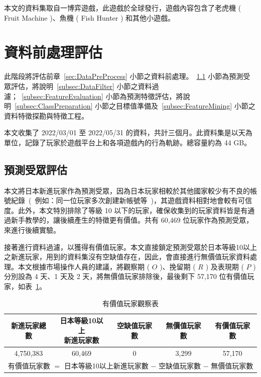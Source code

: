 本文的資料集取自一博弈遊戲，此遊戲於全球發行，遊戲內容包含了老虎機 ( Fruit Machine )、魚機 ( Fish Hunter ) 和其他小遊戲。
\newpage

\section{資料前處理評估}
\label{sec:DataPreprocessEvaluation}

此階段將評估前章~\ref{sec:DataPreProcess} 小節之資料前處理。~\ref{subsec:AudienceEvaluation} 小節為預測受眾評估，將說明~\ref{subsec:DataFilter} 小節之資料過濾；~\ref{subsec:FeatureEvaluation} 小節為預測特徵評估，將說明~\ref{subsec:ClassPreparation} 小節之目標值準備及~\ref{subsec:FeatureMining} 小節之資料特徵探勘與特徵工程。

本文收集了 2022/03/01 至 2022/05/31 的資料，共計三個月。此資料集是以天為單位，記錄了玩家於遊戲平台上和各項遊戲內的行為軌跡。總容量約為 44 GB。

\subsection{預測受眾評估}
\label{subsec:AudienceEvaluation}

本文將日本新進玩家作為預測受眾，因為日本玩家相較於其他國家較少有不良的帳號紀錄\ (\ 例如：同一位玩家多次創建新帳號等\ )，其遊戲資料相對地會較有可信度。此外，本文特別排除了等級 10 以下的玩家，確保收集到的玩家資料皆是有通過新手教學的，讓後續產生的特徵更有價值。共有 60,469 位玩家作為預測受眾，來進行後續實驗。

接著進行資料過濾，以獲得有價值玩家。本文直接鎖定預測受眾於日本等級10以上之新進玩家，用到的資料集沒有空缺值存在，因此，會直接進行無價值玩家資料處理。本文根據市場操作人員的建議，將觀察期 ( $O$ )、挽留期 ( $R$ ) 及表現期 ( $P$ ) 分別設為 4 天、1 天及 2 天，將無價值玩家排除後，最後剩下 57,170 位有價值玩家，如表~\ref{tab:ValuePlayerObservation}。

\begin{table}[!htb]
	\centering
	\begin{tabular}{ccccc}
	\hline \hline
	新進玩家總數 & \tabincell{c}{日本等級10以上\\新進玩家數} & 空缺值玩家數 & 無價值玩家數 & 有價值玩家數 \\
    \hline \hline
    4,750,383 & 60,469 & 0 & 3,299 & 57,170 \\
    \hline
    \multicolumn{5}{c}{有價值玩家數 $=$ 日本等級10以上新進玩家數 $-$ 空缺值玩家數 $-$ 無價值玩家數} \\
    \hline \hline
	\end{tabular}
	\caption[有價值玩家觀察表]{有價值玩家觀察表}
	\label{tab:ValuePlayerObservation}
\end{table}
\newpage


